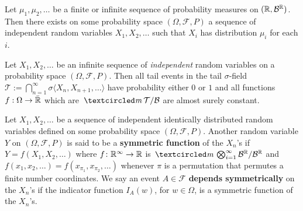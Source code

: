 
\begin{theorem}
\label{thm: existance of independent rvs}
Let $\mu_1,\mu_2,\ldots$ be a finite or infinite sequence of probability measures on $(\Bbb R, \mathcal B^{\Bbb R})$. Then there exists on some probability space $(\Omega, \mathcal F, P)$ a sequence of independent random variables $X_1,X_2,\ldots$ such that $X_i$ has distribution $\mu_i$ for each $i$.
\end{theorem}








\begin{theorem}
Let $X_1, X_2, \ldots$ be an infinite sequence of {\sl independent} random variables on a probability space $(\Omega, \mathcal F, P)$. Then all tail events in the tail $\sigma$-field $\mathcal T:= \bigcap_{n=1}^\infty \sigma\langle X_n, X_{n+1},\ldots \rangle$ have probability either $0$ or $1$ and all functions $f:\Omega \rightarrow \bar{\Bbb R}$ which are $\mcirc \mathcal T/\mathcal B$ are almost surely constant.
\end{theorem}

\begin{shaded}
\begin{definition}
Let $X_1,X_2,\ldots$ be a sequence of independent identically distributed random variables defined on some probability space $(\Omega, \mathcal F, P)$.  Another random variable $Y$ on $(\Omega, \mathcal F, P)$ is said to be a {\bf symmetric function} of the $X_n$'s if $Y=f(X_1,X_2,\ldots)$ where $f\colon\Bbb R^\infty \rightarrow \Bbb R$ is $\mcirc \bigotimes_{i=1}^\infty \mathcal B^{\Bbb R}/\mathcal B^{\Bbb R}$ and $f(x_1,x_2,\ldots)=f(x_{\pi_1},x_{\pi_2},\ldots)$ whenever $\pi$ is a permutation that permutes a finite number coordinates. We say an event $A\in\mathcal F$ {\bf depends symmetrically} on the $X_n$'s if the indicator function $I_A(w)$, for $w\in\Omega$, is a symmetric function of the $X_n$'s.
\end{definition}
\end{shaded}

